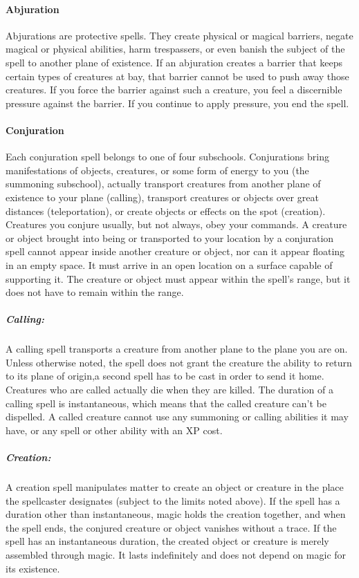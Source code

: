 \paragraph{Abjuration}
Abjurations are protective spells. They create physical or magical barriers, negate magical or physical abilities, harm trespassers, or even banish the subject of the spell to another plane of existence.
If an abjuration creates a barrier that keeps certain types of creatures at bay, that barrier cannot be used to push away those creatures. 
If you force the barrier against such a creature, you feel a discernible pressure against the barrier. 
If you continue to apply pressure, you end the spell.
\paragraph{Conjuration}
Each conjuration spell belongs to one of four subschools. 
Conjurations bring manifestations of objects, creatures, or some form of energy to you (the summoning subschool), actually transport creatures from another plane of existence to your plane (calling), transport creatures or objects over great distances (teleportation), or create objects or effects on the spot (creation). 
Creatures you conjure usually, but not always, obey your commands.
A creature or object brought into being or transported to your location by a conjuration spell cannot appear inside another creature or object, nor can it appear floating in an empty space. It must arrive in an open location on a surface capable of supporting it.
The creature or object must appear within the spell's range, but it does not have to remain within the range.

\subparagraph{Calling:}
A calling spell transports a creature from another plane to the plane you are on. 
Unless otherwise noted, the spell does not grant the creature the ability to return to its plane of origin,a second spell has to be cast in order to send it home.
Creatures who are called actually die when they are killed.
The duration of a calling spell is instantaneous, which means that the called creature can't be dispelled.
A called creature cannot use any summoning or calling abilities it may have, or any spell or other ability with an XP cost.

\subparagraph{Creation:}
A creation spell manipulates matter to create an object or creature in the place the spellcaster designates (subject to the limits noted above). 
If the spell has a duration other than instantaneous, magic holds the creation together, and when the spell ends, the conjured creature or object vanishes without a trace. 
If the spell has an instantaneous duration, the created object or creature is merely assembled through magic. 
It lasts indefinitely and does not depend on magic for its existence.

